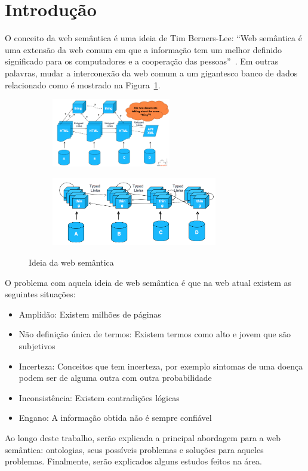 \section{Introdução}
\label{sec:introduction}

O conceito da web semântica é uma ideia de Tim Berners-Lee: ``Web semântica é uma extensão da web comum em que a informação tem um melhor definido significado para os computadores e a cooperação das pessoas''~\cite{BernersLee01}. Em outras palavras, mudar a interconexão da web comum a um gigantesco banco de dados relacionado como é mostrado na Figura~\ref{fig:semantic_web}.

\begin{figure}[H]
	\centering
	\begin{subfigure}{.45\textwidth}
		\centering
		\includegraphics[height=3cm]{images/documentweb}
	\end{subfigure}
	\begin{subfigure}{.45\textwidth}
		\centering
		\includegraphics[height=3cm]{images/dataweb}
	\end{subfigure}
	\caption{Ideia da web semântica}
	\label{fig:semantic_web}
\end{figure}

O problema com aquela ideia de web semântica é que na web atual existem as seguintes situações:
\begin{itemize}
	\item Amplidão: Existem milhões de páginas
	\item Não definição única de termos: Existem termos como alto e jovem que são subjetivos
	\item Incerteza: Conceitos que tem incerteza, por exemplo sintomas de uma doença podem ser de alguma outra com outra probabilidade
	\item Inconsistência: Existem contradições lógicas
	\item Engano: A informação obtida não é sempre confiável
\end{itemize}

Ao longo deste trabalho, serão explicada a principal abordagem para a web semântica: ontologias, seus possíveis problemas e soluções para aqueles problemas. Finalmente, serão explicados alguns estudos feitos na área.
